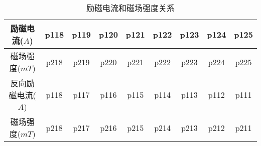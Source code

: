 \newpage
\begin{table}[H]
    \centering
    \begin{tabular}{|c|c|c|c|c|c|c|c|c|}
        \hline
        励磁电流($\si{A}$)   & p118 & p119 & p120 & p121 & p122 & p123 & p124 & p125 \\\hline
        磁场强度($\si{mT}$)  & p218 & p219 & p220 & p221 & p222 & p223 & p224 & p225 \\\hline
        反向励磁电流($\si{A}$) & p118 & p117 & p116 & p115 & p114 & p113 & p112 & p111 \\\hline
        磁场强度($\si{mT}$)  & p218 & p217 & p216 & p215 & p214 & p213 & p212 & p211 \\\hline
    \end{tabular}
    \caption{励磁电流和磁场强度关系}
\end{table}
